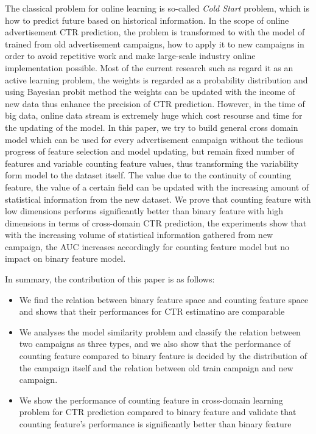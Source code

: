 \documentclass{sig-alternate}
\begin{document}
The classical problem for online learning is so-called \textit{Cold Start} problem, which is how to predict future based on historical information. In the scope of online advertisement CTR prediction, the problem is transformed to with the model of trained from old advertisement campaigns, how to apply it to new campaigns in order to avoid repetitive work and make large-scale industry online implementation possible. Most of the current research such as \cite{mohan2011web} \cite{chu2011unbiased} \cite{he2014practical}\cite{mcmahan2013ad} regard it as an active learning problem, the weights is regarded as a probability distribution and using Bayesian probit method the weights can be updated with the income of new data thus enhance the precision of CTR prediction. However, in the time of big data, online data stream is extremely huge which cost resourse and time for the updating of the model. In this paper, we try to build general cross domain model which can be used for every advertisement campaign without the tedious progress of feature selection and model updating, but remain fixed number of features and variable counting feature values, thus transforming the variability form model to the dataset itself. The value  due to the continuity of counting feature, the value of a certain field can be updated with the increasing amount of statistical information from the new dataset. We prove that counting feature with low dimensions performs significantly better than binary feature with high dimensions in terms of cross-domain CTR prediction, the experiments show that with the increasing volume of statistical information gathered from new campaign, the AUC increases accordingly for counting feature model but no impact on binary feature model. 

In summary, the contribution of this paper is as follows:

\begin{itemize}
\item We find the relation between binary feature space and counting feature space and shows that their performances for CTR estimatino are comparable
\item We analyses the model similarity problem and classify the relation between two campaigns as three types, and we also show that the performance of counting feature compared to binary feature is decided by the distribution of the campaign itself and the relation between old train campaign and new campaign.
\item We show the performance of counting feature in cross-domain learning problem for CTR prediction compared to binary feature and validate that counting feature's performance is significantly better than binary feature
\end{itemize}
\end{document}
